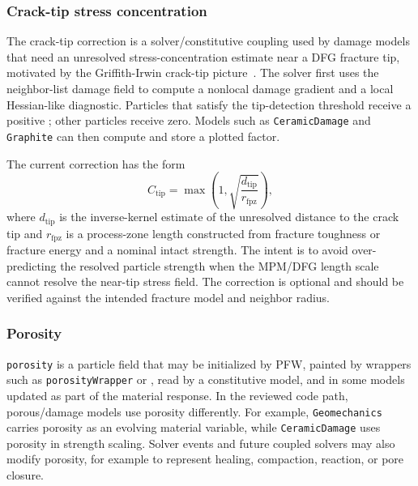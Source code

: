 \subsubsection{Crack-tip stress concentration}
\label{subsubsec:crack-tip-stress-concentration}

The crack-tip correction is a solver/constitutive coupling used by damage models that need an unresolved stress-concentration estimate near a DFG fracture tip, motivated by the Griffith-Irwin crack-tip picture~\cite{griffith1921,irwin1957}.  The solver first uses the neighbor-list damage field to compute a nonlocal damage gradient and a local Hessian-like diagnostic.  Particles that satisfy the tip-detection threshold receive a positive ; other particles receive zero.  Models such as \texttt{CeramicDamage} and \texttt{Graphite} can then compute and store a plotted  factor.

The current correction has the form
\begin{equation}
  C_{\mathrm{tip}}
  = \max\left(1,\sqrt{\frac{d_{\mathrm{tip}}}{r_{\mathrm{fpz}}}}\right),
  \label{eq:crack-tip-stress-concentration-outline}
\end{equation}
where \(d_{\mathrm{tip}}\) is the inverse-kernel estimate of the unresolved distance to the crack tip and \(r_{\mathrm{fpz}}\) is a process-zone length constructed from fracture toughness or fracture energy and a nominal intact strength.  The intent is to avoid over-predicting the resolved particle strength when the MPM/DFG length scale cannot resolve the near-tip stress field.  The correction is optional and should be verified against the intended fracture model and neighbor radius.

\subsubsection{Porosity}
\label{subsubsec:constitutive-porosity}

\texttt{porosity} is a particle field that may be initialized by PFW, painted by wrappers such as \texttt{porosityWrapper} or , read by a constitutive model, and in some models updated as part of the material response.  In the reviewed code path, porous/damage models use porosity differently.  For example, \texttt{Geomechanics} carries porosity as an evolving material variable, while \texttt{CeramicDamage} uses porosity in strength scaling.  Solver events and future coupled solvers may also modify porosity, for example to represent healing, compaction, reaction, or pore closure.

